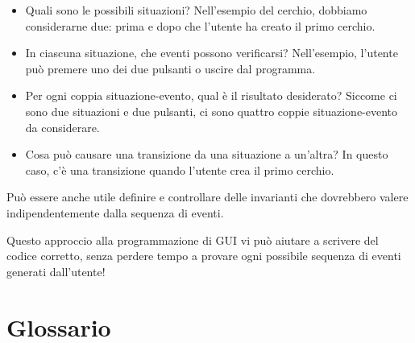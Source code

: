 \documentclass[10pt]{book}
\begin{document}
\begin{itemize}

\item Quali sono le possibili situazioni? Nell'esempio del cerchio, dobbiamo considerarne due: prima e dopo che l'utente ha creato il primo cerchio.

\item In ciascuna situazione, che eventi possono verificarsi? Nell'esempio, l'utente può premere uno dei due pulsanti o uscire dal programma.

\item Per ogni coppia situazione-evento, qual è il risultato desiderato? Siccome ci sono due situazioni e due pulsanti, ci sono quattro coppie situazione-evento da considerare.

\item Cosa può causare una transizione da una situazione a un'altra? In questo caso, c'è una transizione quando l'utente crea il primo cerchio.

\end{itemize}

Può essere anche utile definire e controllare delle invarianti che dovrebbero valere indipendentemente dalla sequenza di eventi.

Questo approccio alla programmazione di GUI vi può aiutare a scrivere del codice corretto, senza perdere tempo a provare ogni possibile sequenza di eventi generati dall'utente!


\section{Glossario}
\end{document}
